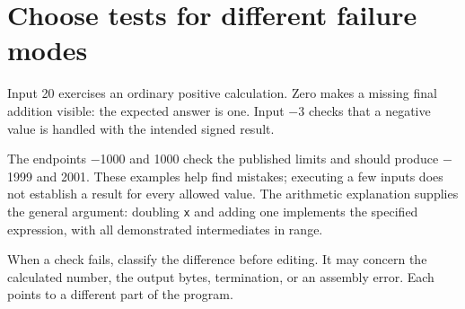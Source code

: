 \section{Choose tests for different failure
  modes}\label{001-console-calculation-p20-choose-tests-for-different-failure-modes}

Input 20 exercises an ordinary positive calculation. Zero makes a
missing final addition visible: the expected answer is one. Input \ensuremath{-}3
checks that a negative value is handled with the intended signed result.

The endpoints \ensuremath{-}1000 and 1000 check the published limits and should
produce \ensuremath{-}1999 and 2001. These examples help find mistakes; executing a
few inputs does not establish a result for every allowed value. The
arithmetic explanation supplies the general argument: doubling
\texttt{x} and adding one implements the specified expression, with all
demonstrated intermediates in range.

When a check fails, classify the difference before editing. It may
concern the calculated number, the output bytes, termination, or an
assembly error. Each points to a different part of the program.

